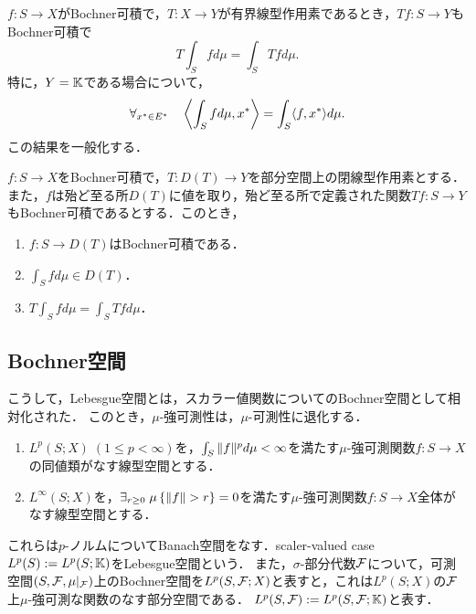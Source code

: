 \documentclass[uplatex,dvipdfmx]{jsreport}
\begin{document}
\begin{discussion}
    $f:S\to X$がBochner可積で，$T:X\to Y$が有界線型作用素であるとき，$Tf:S\to Y$もBochner可積で
    \[T\int_Sfd\mu=\int_STfd\mu.\]
    特に，$Y=\mathbb{K}$である場合について，
    \[\forall_{x^*\in E^*}\quad\left\langle\int_Sfd\mu,x^*\right\rangle=\int_S\langle f,x^*\rangle d\mu.\]
    この結果を一般化する．
\end{discussion}

\begin{theorem}[Hille]
    $f:S\to X$をBochner可積で，$T:D(T)\to Y$を部分空間上の閉線型作用素とする．また，$f$は殆ど至る所$D(T)$に値を取り，殆ど至る所で定義された関数$Tf:S\to Y$もBochner可積であるとする．このとき，
    \begin{enumerate}
        \item $f:S\to D(T)$はBochner可積である．
        \item $\int_Sfd\mu\in D(T)$．
        \item $T\int_Sfd\mu=\int_STfd\mu$．
    \end{enumerate}
\end{theorem}

\subsection{Bochner空間}

\begin{tcolorbox}[colframe=ForestGreen, colback=ForestGreen!10!white,breakable,colbacktitle=ForestGreen!40!white,coltitle=black,fonttitle=\bfseries\sffamily,
title=]
    こうして，Lebesgue空間とは，スカラー値関数についてのBochner空間として相対化された．
    このとき，$\mu$-強可測性は，$\mu$-可測性に退化する．
\end{tcolorbox}

\begin{definition}\mbox{}
    \begin{enumerate}
        \item $L^p(S;X)\;(1\le p<\infty)$を，$\int_S\|f\|^pd\mu<\infty$を満たす$\mu$-強可測関数$f:S\to X$の同値類がなす線型空間とする．
        \item $L^\infty(S;X)$を，$\exists_{r\ge0}\;\mu\Brace{\norm{f}>r}=0$を満たす$\mu$-強可測関数$f:S\to X$全体がなす線型空間とする．
    \end{enumerate}
    これらは$p$-ノルムについてBanach空間をなす．scaler-valued case $L^p(S):=L^p(S;\mathbb{K})$をLebesgue空間という．
    また，$\sigma$-部分代数$\mathcal{F}$について，可測空間$(S,\mathcal{F},\mu|_{\mathcal{F}})$上のBochner空間を$L^p(S,\mathcal{F};X)$と表すと，これは$L^p(S;X)$の$\mathcal{F}$上$\mu$-強可測な関数のなす部分空間である．
    $L^p(S,\mathcal{F}):=L^p(S,\mathcal{F};\mathbb{K})$と表す．
\end{definition}
\end{document}
